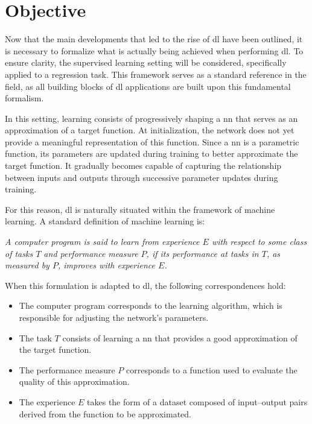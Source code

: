 \section{Objective}\label{sec:deep_learning_objective}

Now that the main developments that led to the rise of \gls{dl} have been outlined, it is necessary to formalize what is actually being achieved when performing \gls{dl}.
To ensure clarity, the supervised learning setting will be considered, specifically applied to a regression task.
This framework serves as a standard reference in the field, as all building blocks of \gls{dl} applications are built upon this fundamental formalism.

In this setting, learning consists of progressively shaping a \gls{nn} that serves as an approximation of a target function.
At initialization, the network does not yet provide a meaningful representation of this function.
Since a \gls{nn} is a parametric function, its parameters are updated during training to better approximate the target function.
It gradually becomes capable of capturing the relationship between inputs and outputs through successive parameter updates during training.

For this reason, \gls{dl} is naturally situated within the framework of machine learning.
A standard definition of machine learning is:
\begin{displayquote}
\textit{A computer program is said to learn from experience $E$ with respect to some class of tasks $T$ and performance measure $P$, if its performance at tasks in $T$, as measured by $P$, improves with experience $E$.} \parencite{mitchell1997machine}
\end{displayquote}

When this formulation is adapted to \gls{dl}, the following correspondences hold:
\begin{itemize}
\item The computer program corresponds to the learning algorithm, which is responsible for adjusting the network's parameters.
\item The task $T$ consists of learning a \gls{nn} that provides a good approximation of the target function.
\item The performance measure $P$ corresponds to a function used to evaluate the quality of this approximation.
\item The experience $E$ takes the form of a dataset composed of input--output pairs derived from the function to be approximated.
\end{itemize}

